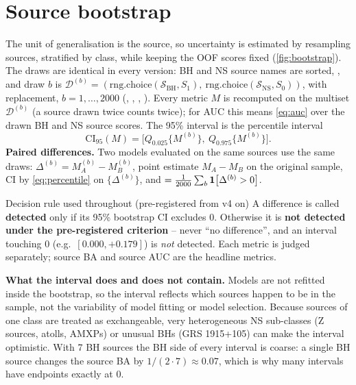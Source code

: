 \section{Source bootstrap}\label{sec:bootstrap}

The unit of generalisation is the source, so uncertainty is estimated by resampling sources, stratified by class, while
keeping the OOF scores fixed (\cref{fig:bootstrap}). The draws are identical in every version: BH and NS source names are
sorted, , and draw $b$ is
$\mathcal D^{(b)} = (\mathrm{rng.choice}(\mathcal S_\mathrm{BH}, S_1),\ \mathrm{rng.choice}(\mathcal S_\mathrm{NS},S_0))$, with
replacement, $b=1,\dots,2000$ (, , ,
). Every metric $M$ is recomputed on the multiset $\mathcal D^{(b)}$ (a source drawn twice
counts twice); for AUC this means \cref{eq:auc} over the drawn BH and NS source scores. The 95\% interval is the percentile
interval
\begin{equation}
\mathrm{CI}_{95}(M) = \bigl[Q_{0.025}\{M^{(b)}\},\ Q_{0.975}\{M^{(b)}\}\bigr].\label{eq:percentile}
\end{equation}
\textbf{Paired differences.} Two models evaluated on the same sources use the same draws:
$\Delta^{(b)} = M_A^{(b)}-M_B^{(b)}$, point estimate $M_A-M_B$ on the original sample, CI by \cref{eq:percentile} on
$\{\Delta^{(b)}\}$, and  $=\frac{1}{2000}\sum_b\mathbf{1}\!\left[\Delta^{(b)}>0\right]$.
\begin{keybox}{Decision rule used throughout (pre-registered from v4 on)}
A difference is called \textbf{detected} only if its 95\% bootstrap CI excludes 0. Otherwise it is
\textbf{not detected under the pre-registered criterion} -- never ``no difference'', and an interval touching 0 (e.g.\
$[0.000, +0.179]$) is \emph{not} detected. Each metric is judged separately; source BA and source AUC are the headline metrics.
\end{keybox}
\textbf{What the interval does and does not contain.} Models are not refitted inside the bootstrap, so the interval
reflects which sources happen to be in the sample, not the variability of model fitting or model selection. Because
sources of one class are treated as exchangeable, very heterogeneous NS sub-classes (Z sources, atolls, AMXPs) or unusual
BHs (GRS 1915+105) can make the interval optimistic. With 7 BH sources the BH side of every interval is coarse: a single
BH source changes the source BA by $1/(2\cdot7)\approx0.07$, which is why many intervals have endpoints exactly at 0.

